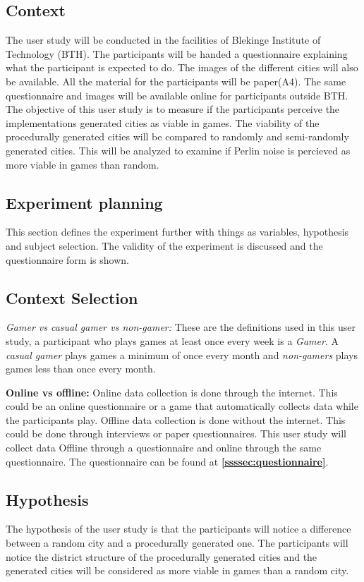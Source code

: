 	\subsection*{Context}
	The user study will be conducted in the facilities of Blekinge Institute of Technology (BTH). The participants will be handed a questionnaire explaining what the participant is expected to do. The images of the different cities will also be available. All the material for the participants will be paper(A4). The same questionnaire and images will be available online for participants outside BTH. The objective of this user study is to measure if the participants perceive the implementations generated cities as viable in games. The viability of the procedurally generated cities will be compared to randomly and semi-randomly generated cities. This will be analyzed to examine if Perlin noise is percieved as more viable in games than random.
	
	\subsection{Experiment planning}
	This section defines the experiment further with things as variables, hypothesis and subject selection. The validity of the experiment is discussed and the questionnaire form is shown.
		
	\subsection*{Context Selection}
	\textit{Gamer vs casual gamer vs non-gamer:} These are the definitions used in this user study, a participant who plays games at least once every week is a \textit{Gamer}. A \textit{casual gamer} plays games a minimum of once every month and \textit{non-gamers} plays games less than once every month. 
			
	\textbf{Online vs offline: }
	Online data collection is done through the internet. This could be an online questionnaire or a game that automatically collects data while the participants play. Offline data collection is done without the internet. This could be done through interviews or paper questionnaires. This user study will collect data Offline through a questionnaire and online through the same questionnaire. The questionnaire can be found at \textbf{\ref{ssssec:questionnaire}}.
			
	\subsection*{Hypothesis}
	The hypothesis of the user study is that the participants will notice a difference between a random city and a procedurally generated one. The participants will notice the district structure of the procedurally generated cities and the generated cities will be considered as more viable in games than a random city.
			

